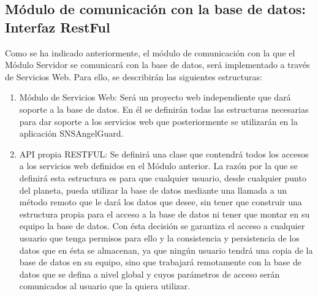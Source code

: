 \subsection{Módulo de comunicación con la base de datos: Interfaz RestFul}
Como se ha indicado anteriormente, el módulo de comunicación con la que el Módulo Servidor se comunicará con la base de datos, será implementado a través de Servicios Web. Para ello, se describirán las siguientes estructuras:
\begin{enumerate}
\item Módulo de Servicios Web: Será un proyecto web independiente que dará soporte a la base de datos. En él se definirán todas las estructuras necesarias para dar soporte a los servicios web que posteriormente se utilizarán en la aplicación SNSAngelGuard.
\item API propia RESTFUL: Se definirá una clase que contendrá todos los accesos a los servicios web definidos en el Módulo anterior. La razón por la que se definirá esta estructura es para que cualquier usuario, desde cualquier punto del planeta, pueda utilizar la base de datos mediante una llamada a un método remoto que le dará los datos que desee, sin tener que construir una estructura propia para el acceso a la base de datos ni tener que montar en su equipo la base de datos. Con ésta decisión se garantiza el acceso a cualquier usuario que tenga permisos para ello y la consistencia y persistencia de los datos que en ésta se almacenan, ya que ningún usuario tendrá una copia de la base de datos en su equipo, sino que trabajará remotamente con la base de datos que se defina a nivel global y cuyos parámetros de acceso serán comunicados al usuario que la quiera utilizar.
\end{enumerate}

